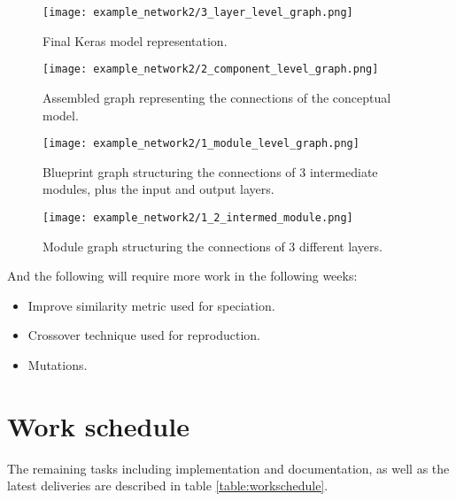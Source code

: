 \documentclass[12pt]{article}
\begin{document}
\begin{figure}[H]
    \centering
    \begin{minipage}[t]{.5\textwidth}
        \centering
        \texttt{[image: example\_network2/3\_layer\_level\_graph.png]}
        \caption{Final Keras model representation.}
        \label{fig:example_network/3_layer_level_graph}
    \end{minipage}
    \hfill
    \begin{minipage}[b]{.45\textwidth}
        \strut\vspace*{-\baselineskip}\newline\centering
        \texttt{[image: example\_network2/2\_component\_level\_graph.png]}
        \caption{Assembled graph representing the connections of the conceptual model.}
        \label{fig:example_network/2_component_level_graph}

        \texttt{[image: example\_network2/1\_module\_level\_graph.png]}
        \caption{Blueprint graph structuring the connections of 3 intermediate modules, plus the input and output layers.}
        \label{fig:example_network/1_module_level_graph}
    
        \texttt{[image: example\_network2/1\_2\_intermed\_module.png]}
        \caption{Module graph structuring the connections of 3 different layers.}
        \label{fig:example_network/1_2_intermed_module}
    \end{minipage}
\end{figure}

And the following will require more work in the following weeks:

\begin{itemize}
        \item Improve similarity metric used for speciation.
        \item Crossover technique used for reproduction.
        \item Mutations.
    \end{itemize}
    
\section{Work schedule}

The remaining tasks including implementation and documentation, as well as the latest deliveries are described in table \ref{table:workschedule}.
\end{document}
